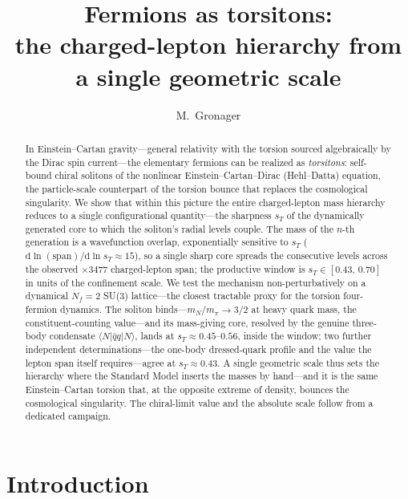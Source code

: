 \documentclass[aps,prd,reprint,nofootinbib,superscriptaddress]{revtex4-2}
\newcommand{\sT}{s_{T}}
\begin{document}
\title{Fermions as torsitons:\\ the charged-lepton hierarchy from a single geometric scale}
\author{M.~Gronager}

\begin{abstract}
In Einstein--Cartan gravity---general relativity with the torsion sourced algebraically by the Dirac
spin current---the elementary fermions can be realized as \emph{torsitons}: self-bound chiral solitons
of the nonlinear Einstein--Cartan--Dirac (Hehl--Datta) equation, the particle-scale counterpart of the
torsion bounce that replaces the cosmological singularity. We show that within this picture the entire
charged-lepton mass hierarchy reduces to a single configurational quantity---the sharpness $\sT$ of the
dynamically generated core to which the soliton's radial levels couple. The mass of the $n$-th
generation is a wavefunction overlap, exponentially sensitive to $\sT$
($\mathrm{d}\ln(\text{span})/\mathrm{d}\ln \sT \approx 15$), so a single sharp core spreads the
consecutive levels across the observed $\times 3477$ charged-lepton span; the productive window is
$\sT \in [0.43,\,0.70]$ in units of the confinement scale. We test the mechanism non-perturbatively on
a dynamical $N_f=2$ SU(3) lattice---the closest tractable proxy for the torsion four-fermion dynamics.
The soliton binds---$m_N/m_\pi \to 3/2$ at heavy quark mass, the constituent-counting value---and its
mass-giving core, resolved by the genuine three-body condensate $\langle N|\bar q q|N\rangle$, lands at
$\sT \approx 0.45$--$0.56$, inside the window; two further independent determinations---the one-body
dressed-quark profile and the value the lepton span itself requires---agree at $\sT \approx 0.43$. A
single geometric scale thus sets the hierarchy where the Standard Model inserts the masses by hand---and
it is the same Einstein--Cartan torsion that, at the opposite extreme of density, bounces the
cosmological singularity. The chiral-limit value and the absolute scale follow from a dedicated campaign.
\end{abstract}

\maketitle

\section{Introduction}
\label{sec:intro}
\end{document}
